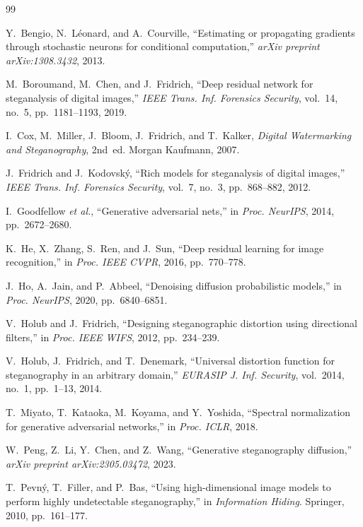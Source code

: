 \documentclass[journal]{IEEEtran}
\begin{document}

\begin{thebibliography}{99}

Y.~Bengio, N.~L{\'e}onard, and A.~Courville, ``Estimating or propagating gradients through stochastic neurons for conditional computation,'' \emph{arXiv preprint arXiv:1308.3432}, 2013.

M.~Boroumand, M.~Chen, and J.~Fridrich, ``Deep residual network for steganalysis of digital images,'' \emph{IEEE Trans. Inf. Forensics Security}, vol.~14, no.~5, pp.~1181--1193, 2019.

I.~Cox, M.~Miller, J.~Bloom, J.~Fridrich, and T.~Kalker, \emph{Digital Watermarking and Steganography}, 2nd~ed. Morgan Kaufmann, 2007.

J.~Fridrich and J.~Kodovsk{\'y}, ``Rich models for steganalysis of digital images,'' \emph{IEEE Trans. Inf. Forensics Security}, vol.~7, no.~3, pp.~868--882, 2012.

I.~Goodfellow \emph{et al.}, ``Generative adversarial nets,'' in \emph{Proc. NeurIPS}, 2014, pp.~2672--2680.

K.~He, X.~Zhang, S.~Ren, and J.~Sun, ``Deep residual learning for image recognition,'' in \emph{Proc. IEEE CVPR}, 2016, pp.~770--778.

J.~Ho, A.~Jain, and P.~Abbeel, ``Denoising diffusion probabilistic models,'' in \emph{Proc. NeurIPS}, 2020, pp.~6840--6851.

V.~Holub and J.~Fridrich, ``Designing steganographic distortion using directional filters,'' in \emph{Proc. IEEE WIFS}, 2012, pp.~234--239.

V.~Holub, J.~Fridrich, and T.~Denemark, ``Universal distortion function for steganography in an arbitrary domain,'' \emph{EURASIP J. Inf. Security}, vol.~2014, no.~1, pp.~1--13, 2014.

T.~Miyato, T.~Kataoka, M.~Koyama, and Y.~Yoshida, ``Spectral normalization for generative adversarial networks,'' in \emph{Proc. ICLR}, 2018.

W.~Peng, Z.~Li, Y.~Chen, and Z.~Wang, ``Generative steganography diffusion,'' \emph{arXiv preprint arXiv:2305.03472}, 2023.

T.~Pevn{\'y}, T.~Filler, and P.~Bas, ``Using high-dimensional image models to perform highly undetectable steganography,'' in \emph{Information Hiding}. Springer, 2010, pp.~161--177.


\end{thebibliography}
\end{document}
